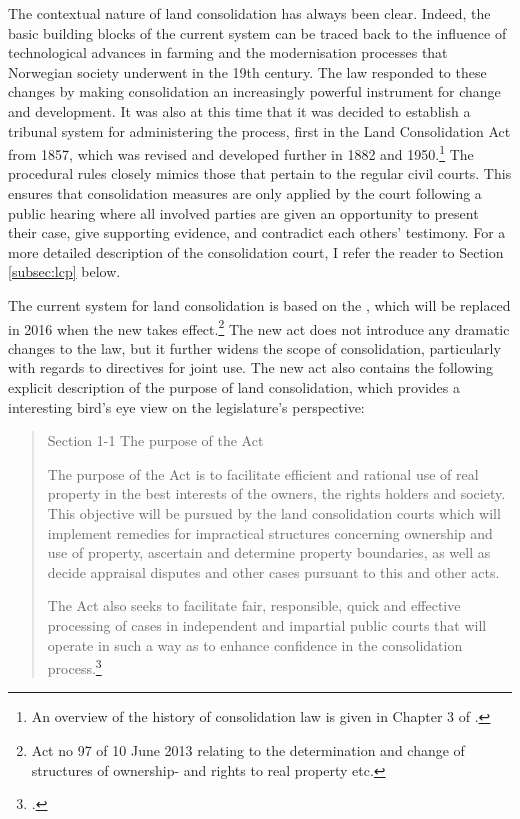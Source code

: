 The contextual nature of land consolidation has always been clear. Indeed, the basic building blocks of the current system can be traced back to the influence of technological advances in farming and the modernisation processes that Norwegian society underwent in the 19th century. The law responded to these changes by making consolidation an increasingly powerful instrument for change and development. It was also at this time that it was decided to establish a tribunal system for administering the process, first in the Land Consolidation Act from 1857, which was revised and developed further in 1882 and 1950.\footnote{An overview of the history of consolidation law is given in Chapter 3 of \cite{prop12}.} The procedural rules closely mimics those that pertain to the regular civil courts. This ensures that consolidation measures are only applied by the court following a public hearing where all involved parties are given an opportunity to present their case, give supporting evidence, and contradict each others' testimony. For a more detailed description of the consolidation court, I refer the reader to Section \ref{subsec:lcp} below.

The current system for land consolidation is based on the \cite{lca79}, which will be replaced in 2016 when the new \cite{lca13} takes effect.\footnote{Act no 97 of 10 June 2013 relating to the determination and change of structures of ownership- and rights to real property etc.} The new act does not introduce any dramatic changes to the law, but it further widens the scope of consolidation, particularly with regards to directives for joint use. The new act also contains the following explicit description of the purpose of land consolidation, which provides a interesting bird's eye view on the legislature's perspective:

\begin{quote}
Section 1-1 The purpose of the Act

The purpose of the Act is to facilitate efficient and rational use of real property in the best interests of the owners, the rights holders and society. This objective will be pursued by the land consolidation courts which will implement remedies for impractical structures concerning ownership and use of property, ascertain and determine property boundaries, as well as decide appraisal disputes and other cases pursuant to this and other acts.

The Act also seeks to facilitate fair, responsible, quick and effective processing of cases in independent and impartial public courts that will operate in such a way as to enhance confidence in the consolidation process.\footcite[1]{lca13}
\end{quote}

